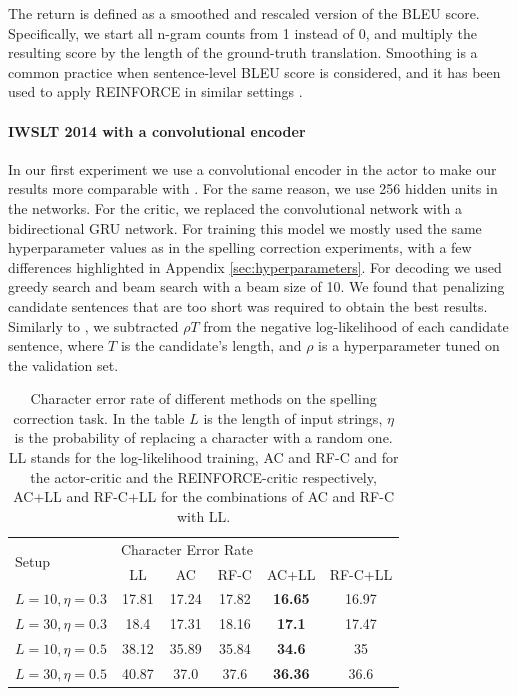 \documentclass{article} %
\begin{document}
The return is defined as a smoothed and rescaled version of the BLEU score. Specifically,
we start all n-gram counts from 1 instead of 0, and multiply the resulting score
by the length of the ground-truth translation. Smoothing is a common practice when sentence-level
BLEU score is considered, and it has been used to apply REINFORCE in similar settings
\citep{ranzato2015sequence}.

\paragraph{IWSLT 2014 with a convolutional encoder}

In our first experiment we use a convolutional encoder in the actor to make our results more comparable with \citet{ranzato2015sequence}.
For the same reason, we use 256 hidden units in the  networks.
For the critic, we replaced the convolutional network with a bidirectional GRU network.
For training this model we mostly used the same hyperparameter values as in the spelling 
correction experiments, with a few differences highlighted in Appendix \ref{sec:hyperparameters}.
For decoding we used greedy search and beam search with a beam size of 10. We
found that penalizing
 candidate sentences that are too short was required to
obtain the best results. Similarly to \citep{hannun2014first},
 we subtracted
$\rho T$ from the negative log-likelihood of each candidate
 sentence, where
$T$ is the candidate's length, and $\rho$ is a hyperparameter
 tuned on the
validation set.

\begin{table}%
    \centering
    \caption{Character error rate of different methods on the spelling correction task.
        In the table $L$ is the length of input strings, $\eta$ 
        is the probability of replacing a character with a random one.
        LL stands for the log-likelihood training, AC and RF-C and for the actor-critic and the
        REINFORCE-critic respectively, AC+LL and RF-C+LL for the combinations of AC and RF-C with LL.}
    \begin{tabular}{l | c | c | c | c | c}
        \multirow{2}{*}{Setup} & \multicolumn{3}{|c}{Character Error Rate} \\
                               & LL & AC & RF-C & AC+LL & RF-C+LL \\
        \hline\hline
        $L=10, \eta=0.3$  & 17.81 & 17.24 & 17.82 & \textbf{16.65} & 16.97 \\
        $L=30, \eta=0.3$  & 18.4  & 17.31 & 18.16 & \textbf{17.1} & 17.47 \\
        $L=10, \eta=0.5$  & 38.12 & 35.89 & 35.84 & \textbf{34.6} & 35 \\
        $L=30, \eta=0.5$  & 40.87 & 37.0 & 37.6 & \textbf{36.36} & 36.6 
    \end{tabular}
    \label{tab:spelling}
\end{table}
\end{document}
